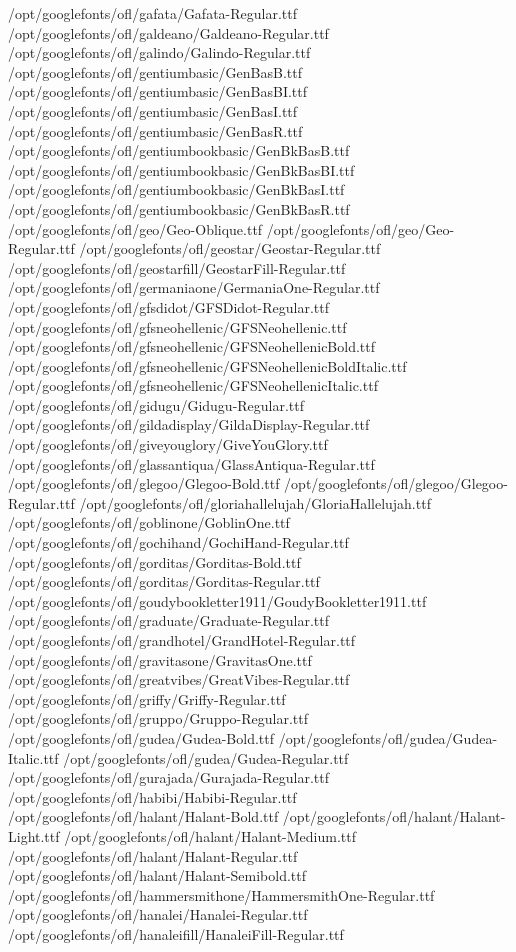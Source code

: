 /opt/googlefonts/ofl/gafata/Gafata-Regular.ttf
/opt/googlefonts/ofl/galdeano/Galdeano-Regular.ttf
/opt/googlefonts/ofl/galindo/Galindo-Regular.ttf
/opt/googlefonts/ofl/gentiumbasic/GenBasB.ttf
/opt/googlefonts/ofl/gentiumbasic/GenBasBI.ttf
/opt/googlefonts/ofl/gentiumbasic/GenBasI.ttf
/opt/googlefonts/ofl/gentiumbasic/GenBasR.ttf
/opt/googlefonts/ofl/gentiumbookbasic/GenBkBasB.ttf
/opt/googlefonts/ofl/gentiumbookbasic/GenBkBasBI.ttf
/opt/googlefonts/ofl/gentiumbookbasic/GenBkBasI.ttf
/opt/googlefonts/ofl/gentiumbookbasic/GenBkBasR.ttf
/opt/googlefonts/ofl/geo/Geo-Oblique.ttf
/opt/googlefonts/ofl/geo/Geo-Regular.ttf
/opt/googlefonts/ofl/geostar/Geostar-Regular.ttf
/opt/googlefonts/ofl/geostarfill/GeostarFill-Regular.ttf
/opt/googlefonts/ofl/germaniaone/GermaniaOne-Regular.ttf
/opt/googlefonts/ofl/gfsdidot/GFSDidot-Regular.ttf
/opt/googlefonts/ofl/gfsneohellenic/GFSNeohellenic.ttf
/opt/googlefonts/ofl/gfsneohellenic/GFSNeohellenicBold.ttf
/opt/googlefonts/ofl/gfsneohellenic/GFSNeohellenicBoldItalic.ttf
/opt/googlefonts/ofl/gfsneohellenic/GFSNeohellenicItalic.ttf
/opt/googlefonts/ofl/gidugu/Gidugu-Regular.ttf
/opt/googlefonts/ofl/gildadisplay/GildaDisplay-Regular.ttf
/opt/googlefonts/ofl/giveyouglory/GiveYouGlory.ttf
/opt/googlefonts/ofl/glassantiqua/GlassAntiqua-Regular.ttf
/opt/googlefonts/ofl/glegoo/Glegoo-Bold.ttf
/opt/googlefonts/ofl/glegoo/Glegoo-Regular.ttf
/opt/googlefonts/ofl/gloriahallelujah/GloriaHallelujah.ttf
/opt/googlefonts/ofl/goblinone/GoblinOne.ttf
/opt/googlefonts/ofl/gochihand/GochiHand-Regular.ttf
/opt/googlefonts/ofl/gorditas/Gorditas-Bold.ttf
/opt/googlefonts/ofl/gorditas/Gorditas-Regular.ttf
/opt/googlefonts/ofl/goudybookletter1911/GoudyBookletter1911.ttf
/opt/googlefonts/ofl/graduate/Graduate-Regular.ttf
/opt/googlefonts/ofl/grandhotel/GrandHotel-Regular.ttf
/opt/googlefonts/ofl/gravitasone/GravitasOne.ttf
/opt/googlefonts/ofl/greatvibes/GreatVibes-Regular.ttf
/opt/googlefonts/ofl/griffy/Griffy-Regular.ttf
/opt/googlefonts/ofl/gruppo/Gruppo-Regular.ttf
/opt/googlefonts/ofl/gudea/Gudea-Bold.ttf
/opt/googlefonts/ofl/gudea/Gudea-Italic.ttf
/opt/googlefonts/ofl/gudea/Gudea-Regular.ttf
/opt/googlefonts/ofl/gurajada/Gurajada-Regular.ttf
/opt/googlefonts/ofl/habibi/Habibi-Regular.ttf
/opt/googlefonts/ofl/halant/Halant-Bold.ttf
/opt/googlefonts/ofl/halant/Halant-Light.ttf
/opt/googlefonts/ofl/halant/Halant-Medium.ttf
/opt/googlefonts/ofl/halant/Halant-Regular.ttf
/opt/googlefonts/ofl/halant/Halant-Semibold.ttf
/opt/googlefonts/ofl/hammersmithone/HammersmithOne-Regular.ttf
/opt/googlefonts/ofl/hanalei/Hanalei-Regular.ttf
/opt/googlefonts/ofl/hanaleifill/HanaleiFill-Regular.ttf

